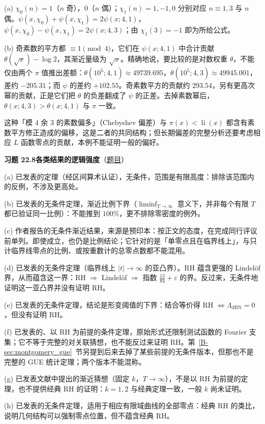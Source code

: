 \documentclass[11pt,a4paper]{article}
\DeclareMathOperator{\li}{li}
\newcommand{\bref}[1]{\ref*{B-#1}}
\newcommand{\Sol}[2]{%
  \par\addvspace{1.2em}\noindent
  \hypertarget{s:#1}{}\textbf{习题 #1\quad #2}\hfill{\small（\hyperlink{q:#1}{题目}）}\par
  \nopagebreak\smallskip}
\begin{document}
(a) $\chi_0(n)=1$（$n$ 奇），$0$（$n$ 偶）；$\chi_1(n)=1,-1,0$ 分别对应 $n\equiv1,3$ 与 $n$ 偶。$\psi(x,\chi_0)+\psi(x,\chi_1)=2\psi(x;4,1)$，$\psi(x,\chi_0)-\psi(x,\chi_1)=2\psi(x;4,3)$；由 $\overline{\chi_1(3)}=-1$ 即为所给公式。

(b) 奇素数的平方都 $\equiv1\pmod4$，它们在 $\psi(x;4,1)$ 中合计贡献 $\theta(\sqrt x)-\log2$，其渐近量级为 $\sqrt x$。精确地说，要比较的是对数权重 $\theta$，不能仅由两个 $\pi$ 值推出差额：$\theta(10^5;4,1)\approx49739.695$，$\theta(10^5;4,3)\approx49945.001$，差约 $-205.31$；而 $\psi$ 的差约 $+102.55$。奇素数平方的贡献约 $293.54$，另有更高次幂的贡献，正是它们把 $\theta$ 的负差翻成了 $\psi$ 的正差。去掉素数幂后，$\theta(x;4,3)>\theta(x;4,1)$ 与 $\pi$ 一致。

这种「模 $4$ 余 $3$ 的素数偏多」（Chebyshev 偏差）与 $\pi(x)<\li(x)$ 都含有素数平方修正造成的偏移，这是二者的共同结构；但长期偏差的完整分析还要考虑相应 $L$ 函数零点的贡献，本例不能证明一般的偏好。

\Sol{22.8}{各类结果的逻辑强度}
(a) 已发表的定理（经区间算术认证），无条件，范围是有限高度：排除该范围内的反例，不涉及更高处。

(b) 已发表的无条件定理，渐近比例下界（$\liminf_{T\to\infty}$ 意义下，并非每个有限 $T$ 都已验证同一比例）：不能推到 $100\%$，更不排除零密度的例外。

(c) 作者报告的无条件渐近结果，来源是预印本：按正文的态度，在完成同行评议前单列。即使成立，也仍是比例结论；它针对的是「单零点且在临界线上」，与只计临界线零点的比例、或按重数计的总零点数都不能混用。

(d) 已发表的无条件定理（临界线上 $|t|\to\infty$ 的亚凸界）。RH 蕴含更强的 Lindelöf 界，从而蕴含这一界：RH $\Rightarrow$ Lindelöf $\Rightarrow$ 指数 $\frac{13}{84}+\varepsilon$ 的界。反过来，无条件地证明这一亚凸界并没有证明 RH。

(e) 已发表的无条件定理，结论是形变阈值的下界：结合等价得 RH $\iff\Lambda_{\mathrm{dBN}}=0$，但没有证明 RH。

(f) 已发表的、以 RH 为前提的条件定理，原始形式还限制测试函数的 Fourier 支集；它不等于完整的对关联猜想，也不能反过来证明 RH。第~\bref{sec:montgomery_gue}~节另提到后来去掉了某些前提的无条件版本，但那也不是完整的 GUE 统计定理；两个版本不能混称。

(g) 已发表文献中提出的渐近猜想（固定 $k$，$T\to\infty$），不是以 RH 为前提的定理，也不提供经典 RH 的证明：$k=1,2$ 与经典定理一致，一般 $k$ 尚未证明。

(h) 已发表的无条件定理，适用于相应有限域曲线的全部零点：经典 RH 的类比，说明几何结构可以强制零点位置，但不蕴含经典 RH。
\end{document}

